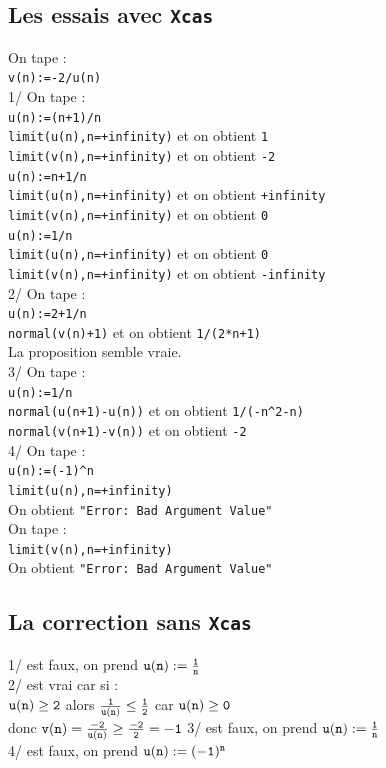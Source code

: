 \documentclass[a4paper,11pt]{book}
\begin{document}
\subsection{Les essais avec {\tt Xcas}}
On tape :\\
{\tt v(n):=-2/u(n)}\\
1/ On tape :\\
{\tt u(n):=(n+1)/n}\\
{\tt limit(u(n),n=+infinity)} et on obtient {\tt 1}\\
{\tt limit(v(n),n=+infinity)} et on obtient {\tt -2}\\
{\tt u(n):=n+1/n}\\
{\tt limit(u(n),n=+infinity)} et on obtient {\tt +infinity}\\
{\tt limit(v(n),n=+infinity)} et on obtient {\tt 0}\\
{\tt u(n):=1/n}\\
{\tt limit(u(n),n=+infinity)} et on obtient {\tt 0}\\
{\tt limit(v(n),n=+infinity)} et on obtient {\tt -infinity}\\
2/ On tape :\\
{\tt u(n):=2+1/n}\\
{\tt normal(v(n)+1)} et on obtient {\tt 1/(2*n+1)}\\
La proposition semble vraie.\\
3/ On tape :\\
{\tt u(n):=1/n}\\
{\tt normal(u(n+1)-u(n))} et on obtient {\tt 1/(-n\verb|^|2-n)}\\
{\tt normal(v(n+1)-v(n))} et on obtient {\tt -2}\\
4/ On tape :\\
{\tt u(n):=(-1)\verb|^|n}\\
{\tt limit(u(n),n=+infinity)}\\
On obtient {\tt "Error: Bad Argument Value"}\\
On tape :\\
{\tt limit(v(n),n=+infinity)}\\
On obtient {\tt "Error: Bad Argument Value"}
\subsection{La correction sans {\tt Xcas}}
1/ est faux, on prend ${\tt u(n):=\frac{1}{n}}$\\
2/ est vrai car si :\\
${\tt u(n) \geq 2}$ alors ${\tt \frac{1}{u(n)} \leq \frac{1}{2}}$ car 
${\tt u(n) \geq 0}$\\
donc  ${\tt v(n)=\frac{-2}{u(n)} \geq \frac{-2}{2}=-1}$
3/ est faux, on prend ${\tt u(n):=\frac{1}{n}}$\\
4/ est faux, on prend ${\tt u(n):=(-1)^n}$\\
\end{document}
